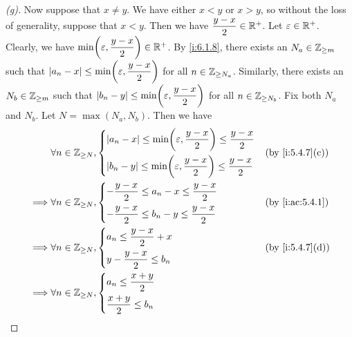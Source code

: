 \begin{proof}[(g)]
  Now suppose that \(x \neq y\).
  We have either \(x < y\) or \(x > y\), so without the loss of generality, suppose that \(x < y\).
  Then we have \(\dfrac{y - x}{2} \in \mathbb{R}^+\).
  Let \(\varepsilon \in \mathbb{R}^+\).
  Clearly, we have \(\min\pa{\varepsilon, \dfrac{y - x}{2}} \in \R^+\).
  By \cref{i:6.1.8}, there exists an \(N_a \in \mathbb{Z}_{\geq m}\) such that \(\abs{a_n - x} \leq \min\pa{\varepsilon, \dfrac{y - x}{2}}\) for all \(n \in \mathbb{Z}_{\geq N_a}\).
  Similarly, there exists an \(N_b \in \mathbb{Z}_{\geq m}\) such that \(\abs{b_n - y} \leq \min\pa{\varepsilon, \dfrac{y - x}{2}}\) for all \(n \in \mathbb{Z}_{\geq N_b}\).
  Fix both \(N_a\) and \(N_b\).
  Let \(N = \max(N_a, N_b)\).
  Then we have
  \begin{align*}
             & \forall n \in \Z_{\geq N}, \begin{dcases}
                                            \abs{a_n - x} \leq \min\pa{\varepsilon, \dfrac{y - x}{2}} \leq \dfrac{y - x}{2} \\
                                            \abs{b_n - y} \leq \min\pa{\varepsilon, \dfrac{y - x}{2}} \leq \dfrac{y - x}{2}
                                          \end{dcases} &  & \by{i:5.4.7}[c] \\
    \implies & \forall n \in \Z_{\geq N}, \begin{dcases}
                                            -\dfrac{y - x}{2} \leq a_n - x \leq \dfrac{y - x}{2} \\
                                            -\dfrac{y - x}{2} \leq b_n - y \leq \dfrac{y - x}{2}
                                          \end{dcases}                                   &  & \by{i:ac:5.4.1}                    \\
    \implies & \forall n \in \Z_{\geq N}, \begin{dcases}
                                            a_n \leq \dfrac{y - x}{2} + x \\
                                            y - \dfrac{y - x}{2} \leq b_n
                                          \end{dcases}                                                 &  & \by{i:5.4.7}[d]      \\
    \implies & \forall n \in \Z_{\geq N}, \begin{dcases}
                                            a_n \leq \dfrac{x + y}{2} \\
                                            \dfrac{x + y}{2} \leq b_n

\end{dcases}
\end{align*}
\end{proof}
